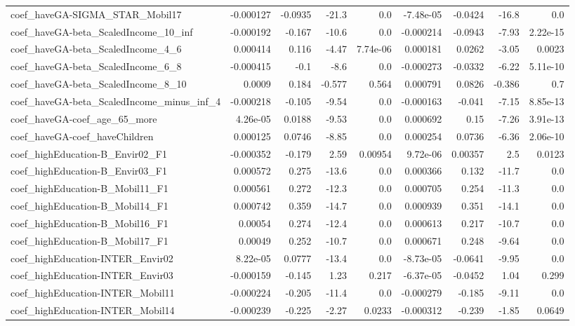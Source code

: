\begin{tabular}{lrrrrrrrr}
coef_haveGA-SIGMA_STAR_Mobil17 & -0.000127 & -0.0935 & -21.3 & 0.0 & -7.48e-05 & -0.0424 & -16.8 & 0.0 \\
coef_haveGA-beta_ScaledIncome_10_inf & -0.000192 & -0.167 & -10.6 & 0.0 & -0.000214 & -0.0943 & -7.93 & 2.22e-15 \\
coef_haveGA-beta_ScaledIncome_4_6 & 0.000414 & 0.116 & -4.47 & 7.74e-06 & 0.000181 & 0.0262 & -3.05 & 0.0023 \\
coef_haveGA-beta_ScaledIncome_6_8 & -0.000415 & -0.1 & -8.6 & 0.0 & -0.000273 & -0.0332 & -6.22 & 5.11e-10 \\
coef_haveGA-beta_ScaledIncome_8_10 & 0.0009 & 0.184 & -0.577 & 0.564 & 0.000791 & 0.0826 & -0.386 & 0.7 \\
coef_haveGA-beta_ScaledIncome_minus_inf_4 & -0.000218 & -0.105 & -9.54 & 0.0 & -0.000163 & -0.041 & -7.15 & 8.85e-13 \\
coef_haveGA-coef_age_65_more & 4.26e-05 & 0.0188 & -9.53 & 0.0 & 0.000692 & 0.15 & -7.26 & 3.91e-13 \\
coef_haveGA-coef_haveChildren & 0.000125 & 0.0746 & -8.85 & 0.0 & 0.000254 & 0.0736 & -6.36 & 2.06e-10 \\
coef_highEducation-B_Envir02_F1 & -0.000352 & -0.179 & 2.59 & 0.00954 & 9.72e-06 & 0.00357 & 2.5 & 0.0123 \\
coef_highEducation-B_Envir03_F1 & 0.000572 & 0.275 & -13.6 & 0.0 & 0.000366 & 0.132 & -11.7 & 0.0 \\
coef_highEducation-B_Mobil11_F1 & 0.000561 & 0.272 & -12.3 & 0.0 & 0.000705 & 0.254 & -11.3 & 0.0 \\
coef_highEducation-B_Mobil14_F1 & 0.000742 & 0.359 & -14.7 & 0.0 & 0.000939 & 0.351 & -14.1 & 0.0 \\
coef_highEducation-B_Mobil16_F1 & 0.00054 & 0.274 & -12.4 & 0.0 & 0.000613 & 0.217 & -10.7 & 0.0 \\
coef_highEducation-B_Mobil17_F1 & 0.00049 & 0.252 & -10.7 & 0.0 & 0.000671 & 0.248 & -9.64 & 0.0 \\
coef_highEducation-INTER_Envir02 & 8.22e-05 & 0.0777 & -13.4 & 0.0 & -8.73e-05 & -0.0641 & -9.95 & 0.0 \\
coef_highEducation-INTER_Envir03 & -0.000159 & -0.145 & 1.23 & 0.217 & -6.37e-05 & -0.0452 & 1.04 & 0.299 \\
coef_highEducation-INTER_Mobil11 & -0.000224 & -0.205 & -11.4 & 0.0 & -0.000279 & -0.185 & -9.11 & 0.0 \\
coef_highEducation-INTER_Mobil14 & -0.000239 & -0.225 & -2.27 & 0.0233 & -0.000312 & -0.239 & -1.85 & 0.0649 \\

\end{tabular}
